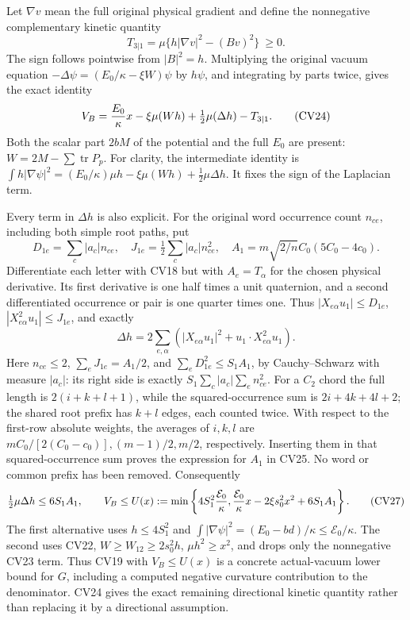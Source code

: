 \documentclass[11pt]{article}
\begin{document}
Let \(\nabla v\) mean the full original physical gradient and define
the nonnegative complementary kinetic quantity
\[
 T_{3|1}=\mu\{h|\nabla v|^2-(Bv)^2\}\ \ge0.              \tag{CV23}
\]
The sign follows pointwise from \(|B|^2=h\). Multiplying the original
vacuum equation \(-\Delta\psi=(E_0/\kappa-\xi W)\psi\)
by \(h\psi\), and integrating by parts twice, gives the exact identity
\[
 V_B={E_0\over\kappa}x-\xi\mu(Wh)
                 +\tfrac12\mu(\Delta h)-T_{3|1}.        \tag{CV24}
\]
Both the scalar part \(2bM\) of the potential and the full \(E_0\)
are present: \(W=2M-\sum\operatorname{tr}P_p\).
For clarity, the intermediate identity is
\(\int h|\nabla\psi|^2=(E_0/\kappa)\mu h-\xi\mu(Wh)
+\frac12\mu\Delta h\). It fixes the sign of the Laplacian term.

Every term in \(\Delta h\) is also explicit. For the original word
occurrence count \(n_{ce}\), including both simple root paths, put
\[
 D_{1e}=\sum_c|a_c|n_{ce},\quad
 J_{1e}=\tfrac12\sum_c|a_c|n_{ce}^2,\quad
 A_1=m\sqrt{2/n}C_0(5C_0-4c_0).                         \tag{CV25}
\]
Differentiate each letter with CV18 but with \(A_e=T_\alpha\) for
the chosen physical derivative. Its first derivative is one half
times a unit quaternion, and a second differentiated occurrence or
pair is one quarter times one. Thus
\(|X_{e\alpha}u_1|\le D_{1e}\),
\(|X_{e\alpha}^2u_1|\le J_{1e}\), and exactly
\[
 \Delta h=2\sum_{e,\alpha}
       (|X_{e\alpha}u_1|^2+u_1\cdot X_{e\alpha}^2u_1).
                                                               \tag{CV26}
\]
Here \(n_{ce}\le2\), \(\sum_eJ_{1e}=A_1/2\), and
\(\sum_eD_{1e}^2\le S_1 A_1\), by Cauchy--Schwarz with measure
\(|a_c|\): its right side is exactly
\(S_1\sum_c|a_c|\sum_en_{ce}^2\).
For a \(C_2\) chord the full length is \(2(i+k+l+1)\), while
the squared-occurrence sum is \(2i+4k+4l+2\); the shared root
prefix has \(k+l\) edges, each counted twice. With respect to
the first-row absolute weights, the averages of \(i,k,l\) are
\(mC_0/[2(C_0-c_0)],(m-1)/2,m/2\), respectively. Inserting them
in that squared-occurrence sum proves the expression for \(A_1\)
in CV25. No word or common prefix has been removed.
Consequently
\[
 \tfrac12\mu\Delta h\le6S_1A_1,
 \qquad
 V_B\le U(x):=\min\left\{4S_1^2{\mathcal E_0\over\kappa},
 {\mathcal E_0\over\kappa}x-2\xi s_0^2x^2+6S_1A_1\right\}.
                                                               \tag{CV27}
\]
The first alternative uses \(h\le4S_1^2\) and
\(\int|\nabla\psi|^2=(E_0-bd)/\kappa\le\mathcal E_0/\kappa\).
The second uses CV22, \(W\ge W_{12}\ge2s_0^2h\),
\(\mu h^2\ge x^2\), and drops only the nonnegative CV23 term.
Thus CV19 with \(V_B\le U(x)\) is a concrete actual-vacuum lower
bound for \(G\), including a computed negative curvature contribution
to the denominator. CV24 gives the exact remaining directional
kinetic quantity rather than replacing it by a directional assumption.
\end{document}
